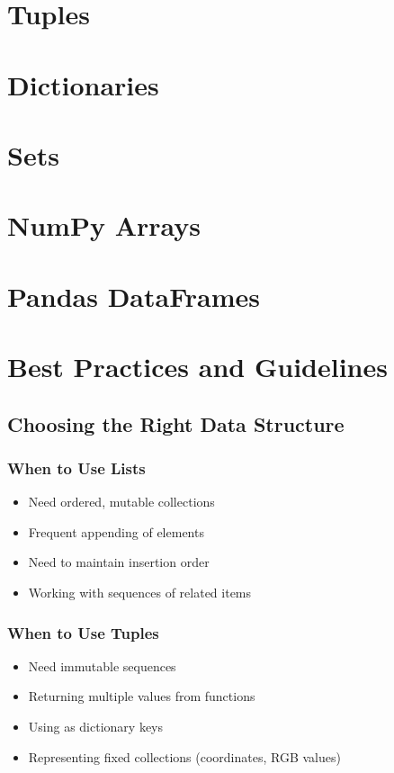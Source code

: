\documentclass[12pt,a4paper]{book}
\begin{document}
\chapter{Tuples}


\chapter{Dictionaries}


\chapter{Sets}


\chapter{NumPy Arrays}


\chapter{Pandas DataFrames}


\chapter{Best Practices and Guidelines}

\section{Choosing the Right Data Structure}

\subsection{When to Use Lists}
\begin{itemize}
    \item Need ordered, mutable collections
    \item Frequent appending of elements
    \item Need to maintain insertion order
    \item Working with sequences of related items
\end{itemize}

\subsection{When to Use Tuples}
\begin{itemize}
    \item Need immutable sequences
    \item Returning multiple values from functions
    \item Using as dictionary keys
    \item Representing fixed collections (coordinates, RGB values)
\end{itemize}
\end{document}
